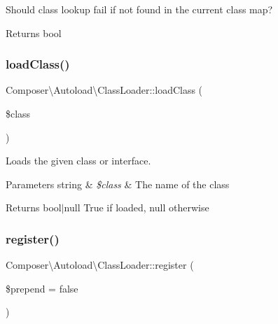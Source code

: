 Should class lookup fail if not found in the current class map?

\begin{DoxyReturn}{Returns}
bool 
\end{DoxyReturn}
\mbox{\label{classComposer_1_1Autoload_1_1ClassLoader_aee0b004fbf0743f16dab70f8a52f983e}} 
\subsubsection{\texorpdfstring{load\+Class()}{loadClass()}}
{\footnotesize\ttfamily Composer\textbackslash{}\+Autoload\textbackslash{}\+Class\+Loader\+::load\+Class (\begin{DoxyParamCaption}\item[{}]{\$class }\end{DoxyParamCaption})}

Loads the given class or interface.


\begin{DoxyParams}[1]{Parameters}
string & {\em \$class} & The name of the class \\
\hline
\end{DoxyParams}
\begin{DoxyReturn}{Returns}
bool$\vert$null True if loaded, null otherwise 
\end{DoxyReturn}
\mbox{\label{classComposer_1_1Autoload_1_1ClassLoader_a478eedf860efe1bc1b2408fc28656111}} 
\subsubsection{\texorpdfstring{register()}{register()}}
{\footnotesize\ttfamily Composer\textbackslash{}\+Autoload\textbackslash{}\+Class\+Loader\+::register (\begin{DoxyParamCaption}\item[{}]{\$prepend = {\ttfamily false} }\end{DoxyParamCaption})}

